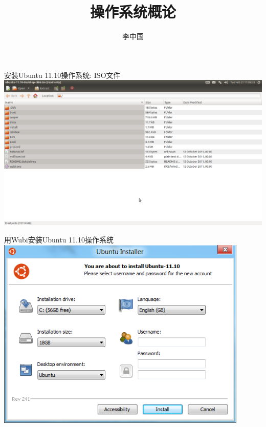 \documentclass[xcolor=svgnames]{beamer}
\begin{document}
\begin{CJK*}{UTF8}{gbsn}


\title{操作系统概论}

\author{李中国}
\date{}

\begin{frame}
  \titlepage
\end{frame}


\begin{frame}{安装Ubuntu 11.10操作系统: ISO文件}
\includegraphics[width=1.5\textwidth]{ubuntu-iso.png}
\end{frame}

\begin{frame}{用Wubi安装Ubuntu 11.10操作系统}
\includegraphics[width=0.9\textwidth]{wubi.png}
\end{frame}


\end{CJK*}
\end{document}
